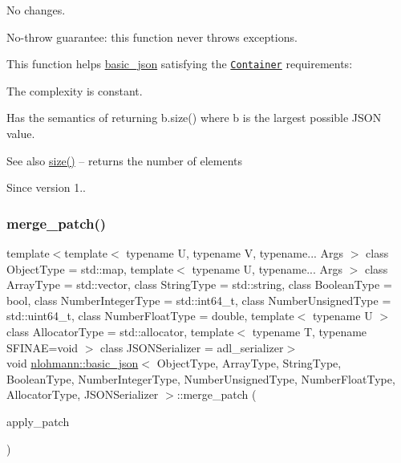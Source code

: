 No changes.

No-\/throw guarantee\+: this function never throws exceptions.

This function helps {\ttfamily \mbox{\hyperlink{classnlohmann_1_1basic__json}{basic\+\_\+json}}} satisfying the \href{https://en.cppreference.com/w/cpp/named_req/Container}{\tt Container} requirements\+:
\begin{DoxyItemize}
\item The complexity is constant.
\item Has the semantics of returning {\ttfamily b.\+size()} where {\ttfamily b} is the largest possible J\+S\+ON value.
\end{DoxyItemize}

\begin{DoxySeeAlso}{See also}
\mbox{\hyperlink{classnlohmann_1_1basic__json_a25e27ad0c6d53c01871c5485e1f75b96}{size()}} -- returns the number of elements
\end{DoxySeeAlso}
\begin{DoxySince}{Since}
version 1.. 
\end{DoxySince}
\mbox{\label{classnlohmann_1_1basic__json_a7c43ed2a3004c1fa9543913f37b9fca9}} 
\subsubsection{\texorpdfstring{merge\+\_\+patch()}{merge\_patch()}}
{\footnotesize\ttfamily template$<$template$<$ typename U, typename V, typename... Args $>$ class Object\+Type = std\+::map, template$<$ typename U, typename... Args $>$ class Array\+Type = std\+::vector, class String\+Type  = std\+::string, class Boolean\+Type  = bool, class Number\+Integer\+Type  = std\+::int64\+\_\+t, class Number\+Unsigned\+Type  = std\+::uint64\+\_\+t, class Number\+Float\+Type  = double, template$<$ typename U $>$ class Allocator\+Type = std\+::allocator, template$<$ typename T, typename S\+F\+I\+N\+A\+E=void $>$ class J\+S\+O\+N\+Serializer = adl\+\_\+serializer$>$ \\
void \mbox{\hyperlink{classnlohmann_1_1basic__json}{nlohmann\+::basic\+\_\+json}}$<$ Object\+Type, Array\+Type, String\+Type, Boolean\+Type, Number\+Integer\+Type, Number\+Unsigned\+Type, Number\+Float\+Type, Allocator\+Type, J\+S\+O\+N\+Serializer $>$\+::merge\+\_\+patch (\begin{DoxyParamCaption}\item[{const \mbox{\hyperlink{classnlohmann_1_1basic__json}{basic\+\_\+json}}$<$ Object\+Type, Array\+Type, String\+Type, Boolean\+Type, Number\+Integer\+Type, Number\+Unsigned\+Type, Number\+Float\+Type, Allocator\+Type, J\+S\+O\+N\+Serializer $>$ \&}]{apply\+\_\+patch }\end{DoxyParamCaption})\hspace{0.3cm}{\ttfamily [inline]}}



